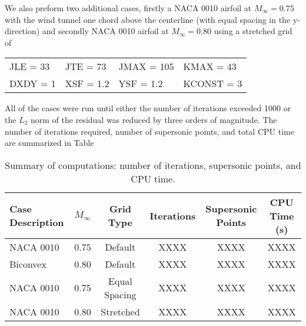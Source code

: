 We also preform two additional cases, firstly a NACA 0010 airfoil at $M_\infty = 0.75$ with the wind tunnel one chord above the centerline (with equal spacing in the y-direction) and secondly NACA 0010 airfoil at $M_\infty = 0.80$ using a stretched grid of

\begin{center}
    \begin{tabular}{@{} l l l l @{}}
        JLE = 33  & JTE = 73  & JMAX = 105  & KMAX = 43 \\
        DXDY = 1  & XSF = 1.2  & YSF = 1.2  & KCONST = 3
    \end{tabular}    
\end{center}

All of the cases were run until either the number of iterations exceeded 1000 or the $L_2$ norm of the residual was reduced by three orders of magnitude. The number of iterations required, number of supersonic points, and total CPU time are summarized in Table


\begin{table}[h]
    \centering
    \begin{tabular}{l c c c c c}
        \hline
        Case Description & $M_\infty$ & Grid Type & Iterations & Supersonic Points & CPU Time (s) \\
        \hline
        NACA 0010 & 0.75 & Default & XXXX & XXXX & XXXX \\
        Biconvex & 0.80 & Default & XXXX & XXXX & XXXX \\
        NACA 0010 & 0.75 & Equal Spacing & XXXX & XXXX & XXXX \\
        NACA 0010 & 0.80 & Stretched & XXXX & XXXX & XXXX \\
        \hline
    \end{tabular}
    \caption{Summary of computations: number of iterations, supersonic points, and CPU time.}
    \label{tab:results}
\end{table}